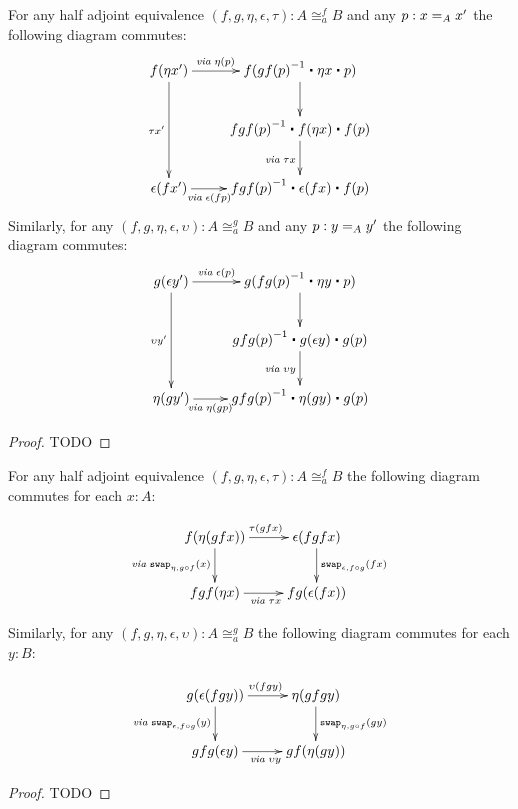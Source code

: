 \begin{cor}\label{lem:higher-hom}
For any half adjoint equivalence $(f,g,\eta,\epsilon,\tau) : A \cong_a^f B$ and any $p : \id[A]{x}{x'}$ the following diagram commutes:
\begin{align*}
\xymatrix{
f(\eta x') \ar[dd]_{\tau x'} \ar[r]^{\mathit{via \;} \eta(p) \;\;\;\;\; \; \;\;\;\;\;\;} & f(\opp{gf(p)} \ct \eta x \ct p) \ar[d] \\
& \opp{fgf(p)} \ct f(\eta x) \ct f(p) \ar[d]_{\mathit{via \;} \tau x} \\
\epsilon(f x') \ar[r]_{\mathit{via \;} \epsilon(fp)\;\;\;\;\; \; \;\;\;\;\;\;\;\;\;\;}  & \opp{fgf(p)} \ct \epsilon (fx) \ct f(p)}
\end{align*}
Similarly, for any $(f,g,\eta,\epsilon,\upsilon) : A \cong_a^g B$ and any $p : \id[A]{y}{y'}$ the following diagram commutes:
\begin{align*}
\xymatrix{
g(\epsilon y') \ar[dd]_{\upsilon y'} \ar[r]^{\mathit{via \;} \epsilon(p) \;\;\;\;\; \; \;\;\;\;\;\;} & g(\opp{fg(p)} \ct \eta y \ct p) \ar[d] \\
& \opp{gfg(p)} \ct g(\epsilon y) \ct g(p) \ar[d]_{\mathit{via \;} \upsilon y} \\
\eta(g y') \ar[r]_{\mathit{via \;} \eta(gp)\;\;\;\;\; \; \;\;\;\;\;\;\;\;\;\;}  & \opp{gfg(p)} \ct \eta (gy) \ct g(p)}
\end{align*}
\end{cor}
\begin{proof}
TODO
\end{proof}

\begin{lem}\label{lem:coh-fg}
For any half adjoint equivalence $(f,g,\eta,\epsilon,\tau) : A \cong_a^f B$ the following diagram commutes for each $x : A$:

\begin{align*}
\xymatrix{
f(\eta (g f x)) \ar[d]_{\mathit{via \; } \com{\eta}{g \circ f}{x}} \ar[r]^{\tau(gfx)} &
\epsilon (fgfx) \ar[d]^{\com{\epsilon}{f\circ g}{fx}} \\
fgf (\eta x) \ar[r]_{\mathit{via \;} \tau x} &
fg(\epsilon (f x))} 
\end{align*}

Similarly, for any $(f,g,\eta,\epsilon,\upsilon) : A \cong_a^g B$ the following diagram commutes for each $y : B$:

\begin{align*}
\xymatrix{
g(\epsilon (f g y)) \ar[d]_{\mathit{via \; } \com{\epsilon}{f \circ g}{y}} \ar[r]^{\upsilon(fgy)} &
\eta (gfgy) \ar[d]^{\com{\eta}{g\circ f}{gy}} \\
gfg (\epsilon y) \ar[r]_{\mathit{via \;} \upsilon y} &
gf(\eta (g y))} 
\end{align*}
\end{lem}
\begin{proof}
TODO
\end{proof}

